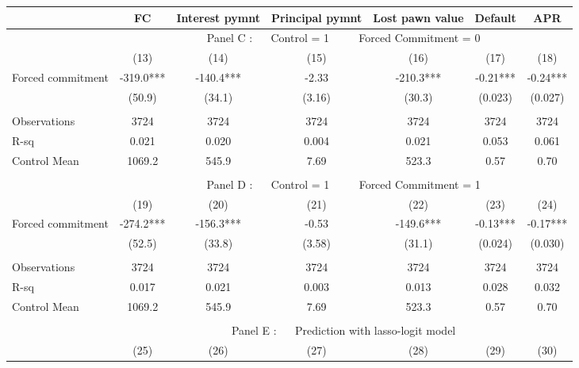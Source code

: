 \begin{tabular}{lcccccc}
\toprule
      & FC    & Interest pymnt & Principal pymnt & Lost pawn value & Default & APR \\
\midrule
      & \multicolumn{6}{c}{Panel C : $\quad$ Control  = 1        $\quad\quad$                     Forced Commitment = 0} \\
\midrule
\midrule
      & (13)  & (14)  & (15)  & (16)  & (17)  & (18) \\
\midrule
\midrule
Forced commitment  & -319.0*** & -140.4*** & -2.33 & -210.3*** & -0.21*** & -0.24*** \\
      & (50.9) & (34.1) & (3.16) & (30.3) & (0.023) & (0.027) \\
      &       &       &       &       &       &  \\
\midrule
Observations & 3724  & 3724  & 3724  & 3724  & 3724  & 3724 \\
R-sq  & 0.021 & 0.020 & 0.004 & 0.021 & 0.053 & 0.061 \\
Control Mean & 1069.2 & 545.9 & 7.69  & 523.3 & 0.57  & 0.70 \\
\midrule
\midrule
      &       &       &       &       &       &  \\
\midrule
      & \multicolumn{6}{c}{Panel D : $\quad$ Control  = 1       $\quad\quad$                      Forced Commitment = 1} \\
\midrule
\midrule
      & (19)  & (20)  & (21)  & (22)  & (23)  & (24) \\
\midrule
\midrule
Forced commitment  & -274.2*** & -156.3*** & -0.53 & -149.6*** & -0.13*** & -0.17*** \\
      & (52.5) & (33.8) & (3.58) & (31.1) & (0.024) & (0.030) \\
      &       &       &       &       &       &  \\
\midrule
Observations & 3724  & 3724  & 3724  & 3724  & 3724  & 3724 \\
R-sq  & 0.017 & 0.021 & 0.003 & 0.013 & 0.028 & 0.032 \\
Control Mean & 1069.2 & 545.9 & 7.69  & 523.3 & 0.57  & 0.70 \\
\midrule
\midrule
      &       &       &       &       &       &  \\
\midrule
      & \multicolumn{6}{c}{Panel E : $\quad$ Prediction with lasso-logit model} \\
\midrule
\midrule
      & (25)  & (26)  & (27)  & (28)  & (29)  & (30) \\

\end{tabular}
